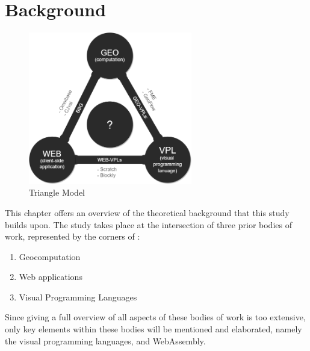 
\chapter{Background}
\label{chap:background}

\begin{figure}
  \centering
  \graphicspath{ {../../assets/diagrams/} }
  \includegraphics[width=270px]{geo-web-vpl.png}
  \caption{Triangle Model}
  \label{fig:triangle-model}
\end{figure}

This chapter offers an overview of the theoretical background that this study builds upon.
The study takes place at the intersection of three prior bodies of work,  represented by the corners of :
\begin{enumerate}[-]
  \item Geocomputation
  \item Web applications
  \item Visual Programming Languages
\end{enumerate}

Since giving a full overview of all aspects of these bodies of work is too extensive, only key elements within these bodies will be mentioned and elaborated, namely the visual programming languages, and WebAssembly.  



